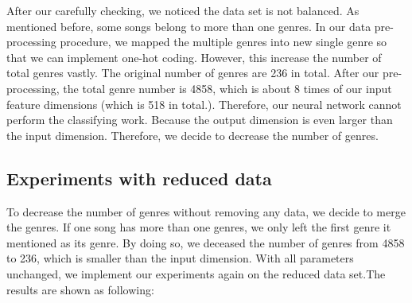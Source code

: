 \documentclass{article}
\begin{document}
After our carefully checking, we noticed the data set is not balanced. As mentioned before, some songs belong to more than one genres. In our data pre-processing procedure, we mapped the multiple genres into new single genre so that we can implement one-hot coding. However, this increase the number of total genres vastly. The original number of genres are 236 in total. After our pre-processing, the total genre number is 4858, which is about 8 times of our input feature dimensions (which is 518 in total.). Therefore, our neural network cannot perform the classifying work. Because the output dimension is even larger than the input dimension. Therefore, we decide to decrease the number of genres.

\subsection{Experiments with reduced data}
To decrease the number of genres without removing any data, we decide to merge the genres. If one song has more than one genres, we only left the first genre it mentioned as its genre. By doing so, we deceased the number of genres from 4858 to 236, which is smaller than the input dimension. With all parameters unchanged, we implement our experiments again on the reduced data set.The results are shown as following:
\end{document}
